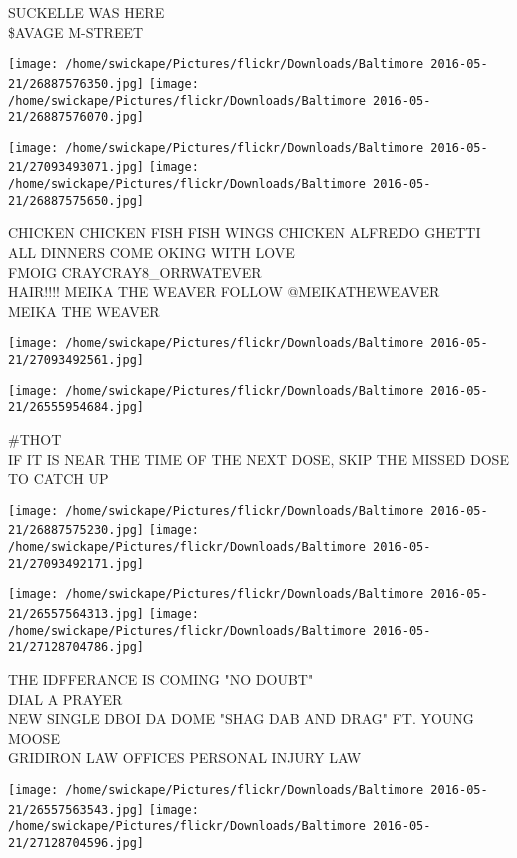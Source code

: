 \documentclass[10pt,letterpaper]{article}
\begin{document}
SUCKELLE WAS HERE\\
\$AVAGE M{-}STREET
\pagebreak

\texttt{[image: /home/swickape/Pictures/flickr/Downloads/Baltimore 2016-05-21/26887576350.jpg]}
\texttt{[image: /home/swickape/Pictures/flickr/Downloads/Baltimore 2016-05-21/26887576070.jpg]}

\texttt{[image: /home/swickape/Pictures/flickr/Downloads/Baltimore 2016-05-21/27093493071.jpg]}
\texttt{[image: /home/swickape/Pictures/flickr/Downloads/Baltimore 2016-05-21/26887575650.jpg]}

CHICKEN CHICKEN FISH FISH WINGS CHICKEN ALFREDO GHETTI ALL DINNERS COME OKING WITH LOVE\\
FMOIG CRAYCRAY8\_ORRWATEVER\\
HAIR!!!! MEIKA THE WEAVER FOLLOW @MEIKATHEWEAVER\\
MEIKA THE WEAVER
\pagebreak

\texttt{[image: /home/swickape/Pictures/flickr/Downloads/Baltimore 2016-05-21/27093492561.jpg]}

\vspace{0.25in}
\texttt{[image: /home/swickape/Pictures/flickr/Downloads/Baltimore 2016-05-21/26555954684.jpg]}

\#THOT\\
IF IT IS NEAR THE TIME OF THE NEXT DOSE, SKIP THE MISSED DOSE TO CATCH UP
\pagebreak

\texttt{[image: /home/swickape/Pictures/flickr/Downloads/Baltimore 2016-05-21/26887575230.jpg]}
\texttt{[image: /home/swickape/Pictures/flickr/Downloads/Baltimore 2016-05-21/27093492171.jpg]}

\texttt{[image: /home/swickape/Pictures/flickr/Downloads/Baltimore 2016-05-21/26557564313.jpg]}
\texttt{[image: /home/swickape/Pictures/flickr/Downloads/Baltimore 2016-05-21/27128704786.jpg]}

THE IDFFERANCE IS COMING "NO DOUBT"\\
DIAL A PRAYER\\
NEW SINGLE DBOI DA DOME "SHAG DAB AND DRAG" FT. YOUNG MOOSE\\
GRIDIRON LAW OFFICES PERSONAL INJURY LAW
\pagebreak

\texttt{[image: /home/swickape/Pictures/flickr/Downloads/Baltimore 2016-05-21/26557563543.jpg]}
\texttt{[image: /home/swickape/Pictures/flickr/Downloads/Baltimore 2016-05-21/27128704596.jpg]}
\end{document}
